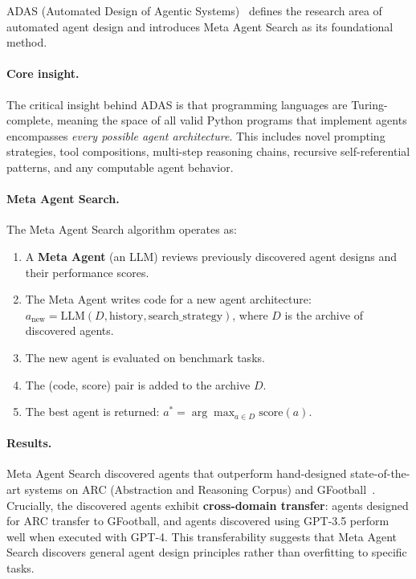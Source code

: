 ADAS (Automated Design of Agentic Systems)~\citep{hu2024adas} defines the research area of automated agent design and introduces Meta Agent Search as its foundational method.

\paragraph{Core insight.}
The critical insight behind ADAS is that programming languages are Turing-complete, meaning the space of all valid Python programs that implement agents encompasses \emph{every possible agent architecture}. This includes novel prompting strategies, tool compositions, multi-step reasoning chains, recursive self-referential patterns, and any computable agent behavior.

\paragraph{Meta Agent Search.}
The Meta Agent Search algorithm operates as:
\begin{enumerate}
    \item A \textbf{Meta Agent} (an LLM) reviews previously discovered agent designs and their performance scores.
    \item The Meta Agent writes code for a new agent architecture: $a_{\text{new}} = \text{LLM}(D, \text{history}, \text{search\_strategy})$, where $D$ is the archive of discovered agents.
    \item The new agent is evaluated on benchmark tasks.
    \item The (code, score) pair is added to the archive $D$.
    \item The best agent is returned: $a^* = \arg\max_{a \in D} \text{score}(a)$.
\end{enumerate}

\paragraph{Results.}
Meta Agent Search discovered agents that outperform hand-designed state-of-the-art systems on ARC (Abstraction and Reasoning Corpus) and GFootball~\citep{hu2024adas}. Crucially, the discovered agents exhibit \textbf{cross-domain transfer}: agents designed for ARC transfer to GFootball, and agents discovered using GPT-3.5 perform well when executed with GPT-4. This transferability suggests that Meta Agent Search discovers general agent design principles rather than overfitting to specific tasks.

